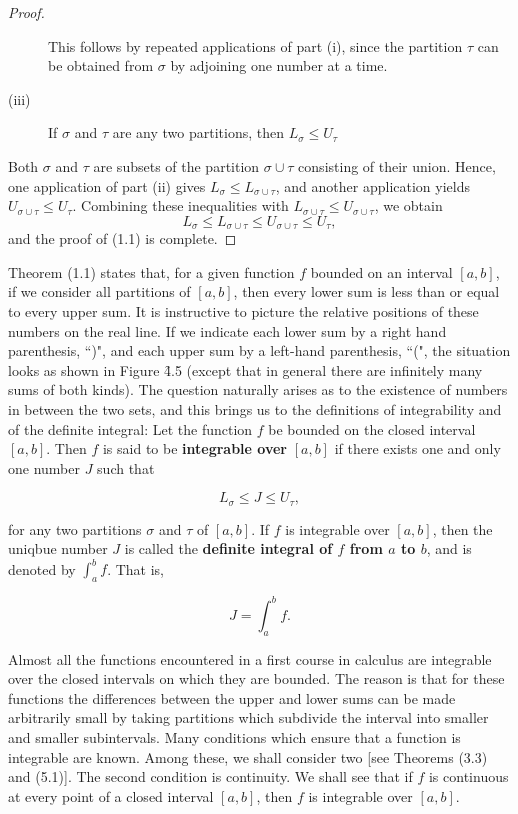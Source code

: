 \begin{proof}
\begin{description}
This follows by repeated applications of part (i), since the partition $\tau$ can be obtained from $\sigma$ by adjoining one number at a time.


\item[(iii)] If $\sigma$ and $\tau$ are any two partitions, then $L_{\sigma} \leq U_{\tau}$

\end{description}

Both $\sigma$ and $\tau$ are subsets of the partition $\sigma \cup \tau$ consisting of their union. Hence, one application of part (ii) gives $L_{\sigma} \leq L_{\sigma \cup \tau}$, and another application yields $U_{\sigma \cup
\tau} \leq U_{\tau}$. Combining these inequalities with $L_{\sigma \cup \tau} \leq U_{\sigma \cup \tau}$, we obtain
$$
L_{\sigma} \leq L_{\sigma \cup \tau} \leq U_{\sigma \cup \tau} \leq U_{\tau}, 
$$
\noindent and the proof of (1.1) is complete.
\end{proof}

Theorem (1.1) states that, for a given function $f$ bounded on an interval $[a, b]$, if we consider all partitions of $[a, b]$, then every lower sum is less than or equal to every upper sum. It is instructive to picture the relative positions of these numbers on the real line. If we indicate each lower sum by a right hand parenthesis, ``)", and each upper sum by a left-hand parenthesis, ``(", the situation looks as shown in Figure \f{4.5} (except that in general there are infinitely many sums of both kinds). The question naturally arises as to the existence of numbers in between the two sets, and this brings us to the definitions of integrability and of the definite integral:  Let the function $f$ be bounded on the closed interval $[a, b]$. Then $f$ is said to be \textbf{integrable over} $[a, b]$ if there exists one and only one number $J$ such that

\begin{equation}
L_{\sigma} \leq J \leq U_{\tau},
\label{eq4.1.4}
\end{equation}



\noindent for any two partitions $\sigma$ and $\tau$ of $[a, b]$. If $f$ is integrable over $[a, b]$, then the uniqbue number $J$ is called the \textbf{definite integral of $f$ from $a$ to $b$}, and is denoted by $\int_{a}^{b} f$. That is,

$$
J = \int_{a}^{b} f.
$$

Almost all the functions encountered in a first course in calculus are integrable over the closed intervals on which they are bounded. The reason is that for these functions the differences between the upper and lower sums can be made arbitrarily small by taking partitions which subdivide the interval into smaller and smaller subintervals. Many conditions which ensure that a function is integrable are known. Among these, we shall consider two [see Theorems (3.3) and (5.1)]. The second condition is continuity. We shall see that if $f$ is continuous at every point of a closed interval $[a, b]$, then $f$ is integrable over $[a, b]$.

